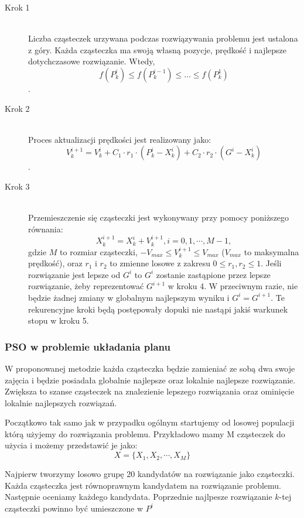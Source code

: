 \begin{description}
  \item[Krok 1] \hfill \\
Liczba cząsteczek urzywana podczas rozwiązywania problemu jest ustalona z góry. Każda cząsteczka ma swoją własną pozycje, prędkość i najlepsze dotychczasowe rozwiązanie. Wtedy,
  \[f(P^{i}_{k}) \le f(P^{i-1}_{k}) \le \ldots \le f(P^{1}_{k})\].

  \item[Krok 2] \hfill \\
Proces aktualizacji prędkości jest realizowany jako:
\[V^{i+1}_{k} = V^{i}_{k} + C_{1} \cdot r_{1} \cdot (P^{i}_{k} - X^{i}_{k}) + C_{2} \cdot r_{2} \cdot (G^{i} - X^{i}_{k})\].
  \item[Krok 3] \hfill \\
Przemieszczenie się cząsteczki jest wykonywany przy pomocy poniższego równania:
\[X^{i+1}_{k} = X^{i}_{k} + V^{i+1}_{k}, i = 0,1,\cdots, M-1,\]
gdzie $M$ to rozmiar cząsteczki, $-V_{max} \le V^{i+1}_{k} \le V_{max}$ ($V_{max}$ to maksymalna prędkość), oraz $r_{1}$ i $r_{2}$ to zmienne losowe z zakresu $0 \le r_{1},r_{2} \le 1$. Jeśli rozwiązanie jest lepsze od $G^{i}$ to $G^{i}$ zostanie zastąpione przez lepsze rozwiązanie, żeby reprezentować $G^{i+1}$ w kroku 4. W przeciwnym razie, nie będzie żadnej zmiany w globalnym najlepszym wyniku i $G^{i} = G^{i+1}$. Te rekurencyjne kroki będą postępowały dopuki nie nastąpi jakiś warkunek stopu w kroku 5.  
\end{description}

\subsubsection{PSO w problemie układania planu}
\par W proponowanej metodzie każda cząsteczka będzie zamieniać ze sobą dwa swoje zajęcia i będzie posiadała globalnie najlepsze oraz lokalnie najlepsze rozwiązanie. Zwiększa to szanse cząsteczek na znalezienie lepszego rozwiązania oraz ominięcie lokalnie najlepszych rozwiązań. 
\par Początkowo tak samo jak w przypadku ogólnym startujemy od losowej populacji którą użyjemy do rozwiązania problemu. Przykładowo mamy M cząsteczek do użycia i możemy przedstawić je jako:
\[X = \{X_{1},X_{2},\cdots,X_{M}\}\]

\par Najpierw tworzymy losowo grupę 20 kandydatów na rozwiązanie jako cząsteczki. Każda cząsteczka jest równoprawnym kandydatem na rozwiązanie problemu. Następnie oceniamy każdego kandydata. Poprzednie najlpesze rozwiązanie $k$-tej cząsteczki powinno być umieszczone w $P^{i}$

